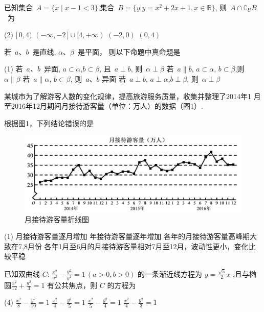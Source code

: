 \documentclass[a4paper, zihao = 5, unicodeGBMath, %
]{ctexart}
\begin{document}
\begin{qus}
\item  已知集合~$A=\{x\mid {x-1}<3 \}$,集合~$B=\{y|
  y=x^2+2x+1,x\in\mathbb{R}\}$, 则~$A\cap \complement_U B$~为

  \begin{tasks}(2)
    \task $[\,0,4)$ \task $(-\infty,-2\,]\cup[4,+\infty)$ \task $(-2,0)$
    \task $(0,4)$
  \end{tasks}

\item  若~$a$、$b$~是直线, $\alpha$、$\beta$~是平面，
  则以下命题中真命题是

  \begin{tasks}(1)
    \task 若~$a$、$b$~异面, $a\subset\alpha$,$b\subset\beta$, 且~$a\perp b$, 则~$\alpha\perp\beta$
    \task 若~$a\parallel b$, $a\subset\alpha$, $b\subset\beta$,则~$\alpha\parallel\beta$
    \task 若~$a\parallel \alpha$, $b\subset\beta$, 则~$a$、$b$ 异面
    \task 若~$a\perp b$, $a\perp\alpha$,$b\perp\beta$, 则~$\alpha\perp\beta$
  \end{tasks}

\item 某城市为了解游客人数的变化规律，提高旅游服务质量，收集并整理了2014年1
  月至2016年12月期间月接待游客量（单位：万人）的数据（图1）.

  根据图1，下列结论错误的是

  \begin{figure}[!htb]
    \centering
    \includegraphics[width=0.8\linewidth]{zxt.jpg}
    \caption{月接待游客量折线图}
  \end{figure}%

  \begin{tasks}(1)
    \task 月接待游客量逐月增加 
    \task 年接待游客量逐年增加
    \task 各年的月接待游客量高峰期大致在7,8月份 
    \task 各年1月至6月的月接待游客量相对7月至12月，波动性更小，变化比较平稳 
  \end{tasks}

\item 已知双曲线 $C\colon\,\tfrac{x^2}{a^2}-\tfrac{y^2}{b^2}=1\,(a>0,b>0)$
  的一条渐近线方程为 $y=\tfrac{\sqrt{5}}{2}x$ ,且与椭
  圆$\tfrac{x^2}{12}+\tfrac{y^2}{3}=1$ 有公共焦点，则 $C$ 的方程为

  \begin{tasks}(4)
    \task $\tfrac{x^2}{8}-\tfrac{y^2}{10}=1$ \task $\tfrac{x^2}{4}-\tfrac{y^2}{5}=1$ \task $\tfrac{x^2}{5}-\tfrac{y^2}{4}=1$ \task $\tfrac{x^2}{4}-\tfrac{y^2}{3}=1$ 
  \end{tasks}

\end{qus}
\end{document}
